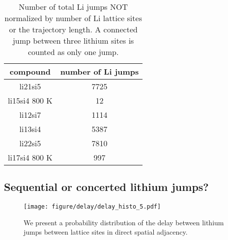 \documentclass{article}
\begin{document}
\FloatBarrier

\begin{table}[h!]
\begin{center}
\begin{tabular}{ c|c } 
compound & number of Li jumps \\ 
\hline
\hline
li21si5 & 7725\\
\hline
li15si4 800 K& 12 \\
\hline
li12si7 & 1114 \\
\hline
li13si4 & 5387 \\
li22si5 & 7810 \\
li17si4 800 K & 997 \\
 \hline
\end{tabular}
\end{center}
\caption{Number of total Li jumps NOT normalized by number of Li lattice  sites or the trajectory length. A connected jump between three lithium sites is counted as only one jump. }
\label{table:1}
\end{table}





  
\FloatBarrier
\subsection{Sequential or concerted lithium jumps?}


\begin{figure}[h!]
\centering
\texttt{[image: figure/delay/delay\_histo\_5.pdf]}
\caption{We present a probability distribution of  the delay between lithium jumps between lattice sites in direct spatial adjacency.}
\end{figure}







 
\end{document}
